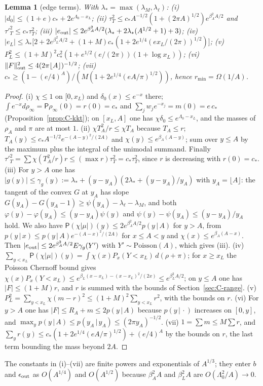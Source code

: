 \documentclass[10pt,letterpaper]{article}
\newtheorem{lemma}[theorem]{Lemma}
\begin{document}
\begin{lemma}[edge terms]\label{lem:C-edge}
With $\lambda_*=\max(\lambda_M,\lambda_\ell)$:
(i) $|d_0|\le(1+e)c_*+2e^{\Lambda_0-x_L}$;
(ii) $\tau_T^2\le c_*A^{-1/2}(1+(2\pi A)^{1/2})e^{\beta_A^2A/2}$ and $\tau'^2_T\le c_*\tau_T^2$;
(iii) $|e_{\rm out}|\le2e^{\beta_A^2A/2}(\lambda_*+2\lambda_*(A^{1/2}+1)+3)$;
(iv) $|e_L|\le\lambda_*\bigl[2+2e^{\beta_L^2A/2}+(1+M)c_*(1+2e^{1/4}(ex_L/(2\pi))^{1/2})\bigr]$;
(v) $P_L^2\le(1+M)^2c_*^2(1+e^{1/2}(e/(2\pi))(1+\log x_L))$;
(vi) $\|F\|^2_{\rm out}\le4(2\pi\lfloor A\rfloor)^{-1/2}$;
(vii) $c_*\ge(1-(e/4)^A)/(M(1+2e^{1/4}(eA/\pi)^{1/2}))$, hence $r_{\min}=\Omega(1/A)$.
\end{lemma}
\begin{proof}
(i) $\chi\le1$ on $[0,x_L)$ and $\delta_0(x)\le e^{-x}$ there; $\int e^{-x}d\rho_\infty=\mathsf P\rho_\infty(0)=r(0)=c_*$ and
$\sum_jw_je^{-x_j}=m(0)=e\,c_*$ (Proposition~\ref{prop:C-kkt}); on $[x_L,A]$ one has $\chi\delta_0\le e^{\Lambda_0-x_L}$, and the masses of
$\rho_A$ and $\pi$ are at most $1$.
(ii) $\chi T_A^2/r\le\chi T_A$ because $T_A\le r$; $T_A(y)\le c_*A^{-1/2}e^{-(A-y)^2/(2A)}$ and $\chi(y)\le e^{\beta_A(A-y)}$; sum over
$y\le A$ by the maximum plus the integral of the unimodal summand. Finally $\tau'^2_T=\sum\chi(T_A^2/r)r\le(\max r)\tau_T^2=c_*\tau_T^2$,
since $r$ is decreasing with $r(0)=c_*$.
(iii) For $y>A$ one has $|g(y)|\le\gamma_g(y):=\lambda_*+(y-y_A)(2\lambda_*+(y-y_A)/y_A)$ with $y_A=\lfloor A\rfloor$: the tangent of the convex
$G$ at $y_A$ has slope $G(y_A)-G(y_A-1)\ge\psi(y_A)-\lambda_\ell-\lambda_M$, and both $\varphi(y)-\varphi(y_A)\le(y-y_A)\psi(y)$ and $\psi(y)-\psi(y_A)\le(y-y_A)/y_A$ hold. We also have $\mathsf P(\chi|\mu|)(y)\le2e^{\beta_A^2A/2}p(y\,|\,A)$ for $y>A$, from
$p(y\,|\,x)\le p(y\,|\,A)e^{-(A-x)^2/(2A)}$ for $x\le A<y$ and $\chi(x)\le e^{\beta_A(A-x)}$. Then
$|e_{\rm out}|\le2e^{\beta_A^2A/2}E\gamma_g(Y')$ with $Y'\sim\mathrm{Poisson}(A)$, which gives (iii).
(iv) $\sum_{y<x_L}\mathsf P(\chi|\mu|)(y)=\int\chi(x)P_x(Y<x_L)\,d(\rho+\pi)$; for $x\ge x_L$ the Poisson Chernoff bound gives
$\chi(x)P_x(Y<x_L)\le e^{\beta_L(x-x_L)-(x-x_L)^2/(2x)}\le e^{\beta_L^2A/2}$; on $y\le A$ one has $|F|\le(1+M)r$, and $r$ is summed with the
bounds of Section~\ref{sec:C-range}.
(v) $P_L^2=\sum_{y<x_L}\chi(m-r)^2\le(1+M)^2\sum_{y<x_L}r^2$, with the bounds on $r$.
(vi) For $y>A$ one has $|F|\le R_A+m\le2p(y\,|\,A)$ because $p(y\,|\,\cdot)$ increases on $[0,y]$, and
$\max_yp(y\,|\,A)\le p(y_A\,|\,y_A)\le(2\pi y_A)^{-1/2}$.
(vii) $1=\sum m\le M\sum r$, and $\sum_yr(y)\le c_*(1+2e^{1/4}(eA/\pi)^{1/2})+(e/4)^A$ by the bounds on $r$, the last term bounding
the mass beyond $2A$.
\end{proof}
The constants in (i)--(vii) are finite powers and exponentials of $A^{1/3}$; they enter $b$ and $\epsilon_{\rm out}$ as $O(A^{1/4})$
and $O(A^{1/2})$ because $\beta_A^2A$ and $\beta_L^2A$ are $O(\Lambda_0^2/A)\to0$.
\end{document}
